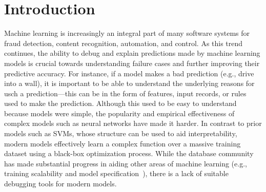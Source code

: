 \section{Introduction}\label{intro}
Machine learning is increasingly an integral part of many software systems for fraud detection, content recognition, automation, and control.
As this trend continues, the ability to debug and explain predictions made by machine learning models is crucial towards understanding failure cases and further improving their predictive accuracy.
For instance, if a model makes a bad prediction (e.g., drive into a wall), it is important to be able to understand the underlying reasons for usch a prediction---this can be in the form of features, input records, or rules used to make the prediction.
Although this used to be easy to understand because models were simple, the popularity and empirical effectiveness of complex models such as neural networks have made it harder.
In contrast to prior models such as SVMs, whose structure can be used to aid interpretability, modern models effectively learn a complex function over a massive training dataset using a black-box optimization process.
While the database community has made substantial progress in aiding other areas of machine learning (e.g., training scalability and model specification~\cite{hellerstein2012madlib,tensor, kraska2013mlbase, crotty2014tupleware, keystone}), there is a lack of suitable debugging tools for modern models.





